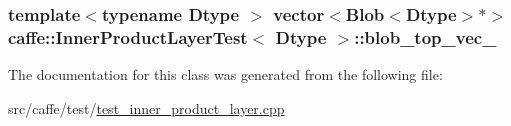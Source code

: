 \hypertarget{classcaffe_1_1_inner_product_layer_test_ac403f0c52fd366423da30010391c270e}{
\subsubsection[{blob\+\_\+top\+\_\+vec\+\_\+}]{\setlength{\rightskip}{0pt plus 5cm}template$<$typename Dtype $>$ vector$<${\bf Blob}$<$Dtype$>$$\ast$$>$ {\bf caffe\+::\+Inner\+Product\+Layer\+Test}$<$ Dtype $>$\+::blob\+\_\+top\+\_\+vec\+\_\+\hspace{0.3cm}{\ttfamily [protected]}}}\label{classcaffe_1_1_inner_product_layer_test_ac403f0c52fd366423da30010391c270e}


The documentation for this class was generated from the following file\+:\begin{DoxyCompactItemize}
\item 
src/caffe/test/\hyperlink{test__inner__product__layer_8cpp}{test\+\_\+inner\+\_\+product\+\_\+layer.\+cpp}\end{DoxyCompactItemize}
